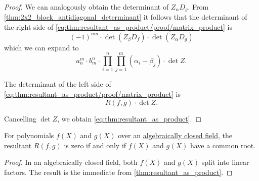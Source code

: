 \begin{proof}
  We can analogously obtain the determinant of \( Z_\alpha D_g \). From \cref{thm:2x2_block_antidiagonal_determinant} it follows that the determinant of the right side of \eqref{eq:thm:resultant_as_product/proof/matrix_product} is
  \begin{equation*}
    (-1)^{nm} \cdot \det(Z_\beta D_f) \cdot \det(Z_\alpha D_g)
  \end{equation*}
  which we can expand to
  \begin{equation*}
    a_n^m \cdot b_m^n \cdot \prod_{i=1}^n \prod_{j=1}^m (\alpha_i - \beta_j) \cdot \det Z.
  \end{equation*}

  The determinant of the left side of \eqref{eq:thm:resultant_as_product/proof/matrix_product} is
  \begin{equation*}
    R(f, g) \cdot \det Z.
  \end{equation*}

  Cancelling \( \det Z \), we obtain \eqref{eq:thm:resultant_as_product}.
\end{proof}

\begin{corollary}\label{thm:resultant_invertibility}
  For polynomials \( f(X) \) and \( g(X) \) over an \hyperref[def:algebraically_closed_field]{algebraically closed field}, the \hyperref[def:resultant]{resultant} \( R(f, g) \) is zero if and only if \( f(X) \) and \( g(X) \) have a common root.
\end{corollary}
\begin{proof}
  In an algebraically closed field, both \( f(X) \) and \( g(X) \) split into linear factors. The result is the immediate from \cref{thm:resultant_as_product}.
\end{proof}

